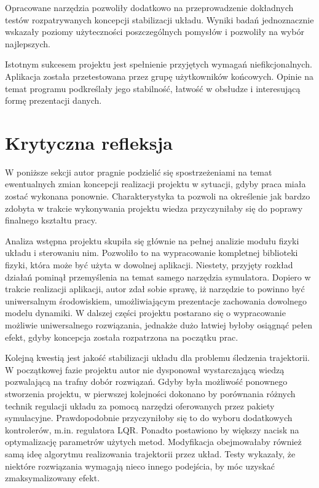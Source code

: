 \documentclass[12pt, oneside]{report}
\theoremstyle{definition}
\begin{document}
Opracowane narzędzia pozwoliły dodatkowo na przeprowadzenie dokładnych testów rozpatrywanych koncepcji stabilizacji układu. Wyniki badań jednoznacznie wskazały poziomy użyteczności poszczególnych pomysłów i pozwoliły na wybór najlepszych.

Istotnym sukcesem projektu jest spełnienie przyjętych wymagań niefikcjonalnych. Aplikacja została przetestowana przez grupę użytkowników końcowych. Opinie na temat programu podkreślały jego stabilność, łatwość w obsłudze i interesującą formę prezentacji danych.

\section{Krytyczna refleksja}
W poniższe sekcji autor pragnie podzielić się spostrzeżeniami na temat ewentualnych zmian koncepcji realizacji projektu w sytuacji, gdyby praca miała zostać wykonana ponownie. Charakterystyka ta pozwoli na określenie jak bardzo zdobyta w trakcie wykonywania projektu wiedza przyczyniłaby się do poprawy finalnego kształtu pracy. 

Analiza wstępna projektu skupiła się głównie na pełnej analizie modułu fizyki układu i sterowaniu nim. Pozwoliło to na wypracowanie kompletnej biblioteki fizyki, która może być użyta w dowolnej aplikacji. Niestety, przyjęty rozkład działań pominął przemyślenia na temat samego narzędzia symulatora. Dopiero w trakcie realizacji aplikacji, autor zdał sobie sprawę, iż narzędzie to powinno być uniwersalnym środowiskiem, umożliwiającym prezentacje zachowania dowolnego modelu dynamiki. W dalszej części projektu postarano się o wypracowanie możliwie uniwersalnego rozwiązania, jednakże dużo łatwiej byłoby osiągnąć pełen efekt, gdyby koncepcja została rozpatrzona na początku prac. 

Kolejną kwestią jest jakość stabilizacji układu dla problemu śledzenia trajektorii. W początkowej fazie projektu autor nie dysponował wystarczającą wiedzą pozwalającą na trafny dobór rozwiązań. Gdyby była możliwość ponownego stworzenia projektu, w pierwszej kolejności dokonano by porównania różnych technik regulacji układu za pomocą narzędzi oferowanych przez pakiety symulacyjne. Prawdopodobnie przyczyniłoby się to do wyboru dodatkowych kontrolerów, m.in. regulatora LQR. Ponadto postawiono by większy nacisk na optymalizację parametrów użytych metod. Modyfikacja obejmowałaby również samą ideę algorytmu realizowania trajektorii przez układ. Testy wykazały, że niektóre rozwiązania wymagają nieco innego podejścia, by móc uzyskać zmaksymalizowany efekt. 
\end{document}
